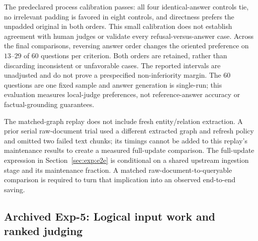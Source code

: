 The predeclared process calibration passes: all four identical-answer controls
tie, no irrelevant padding is favored in eight controls, and directness
prefers the unpadded original in both orders. This small calibration does not
establish agreement with human judges or validate every refusal-versus-answer
case. Across the final comparisons, reversing answer order changes the
oriented preference on $13$--$29$ of $60$ questions per criterion.
Both orders are retained, rather than discarding inconsistent or unfavorable
cases. The reported intervals are unadjusted and do not prove a prespecified
non-inferiority margin. The $60$ questions are one fixed sample and answer
generation is single-run; this evaluation measures local-judge preferences,
not reference-answer accuracy or factual-grounding guarantees.

 The matched-graph replay does not
include fresh entity/relation extraction. A prior serial raw-document trial
used a different extracted graph and refresh policy and omitted two failed
text chunks; its timings cannot be added to this replay's maintenance results
to create a measured full-update comparison. The full-update expression in
Section~\ref{sec:exp:e2e} is conditional on a shared upstream ingestion stage
and its maintenance fraction. A matched raw-document-to-queryable comparison
is required to turn that implication into an observed end-to-end saving.

\subsection{Archived Exp-5: Logical input work and ranked judging}
\label{app:exp5-archived}

